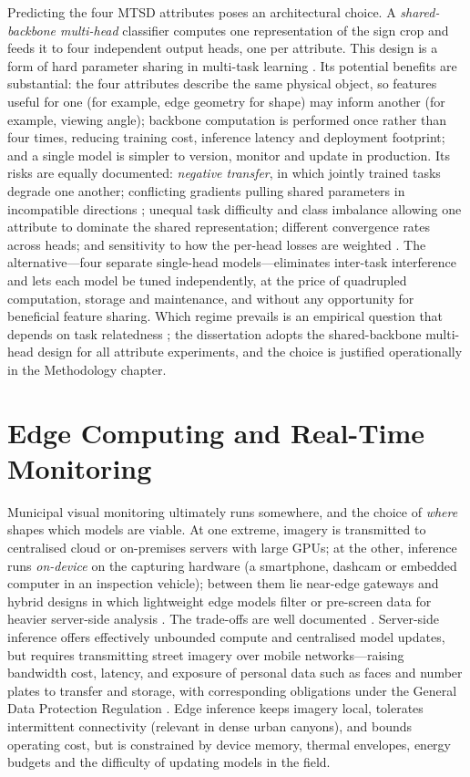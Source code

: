 Predicting the four MTSD attributes poses an architectural choice. A \emph{shared-backbone multi-head} classifier computes one representation of the sign crop and feeds it to four independent output heads, one per attribute. This design is a form of hard parameter sharing in multi-task learning \citep{caruana1997multitask,ruder2017overview}. Its potential benefits are substantial: the four attributes describe the same physical object, so features useful for one (for example, edge geometry for shape) may inform another (for example, viewing angle); backbone computation is performed once rather than four times, reducing training cost, inference latency and deployment footprint; and a single model is simpler to version, monitor and update in production. Its risks are equally documented: \emph{negative transfer}, in which jointly trained tasks degrade one another; conflicting gradients pulling shared parameters in incompatible directions \citep{yu2020gradient}; unequal task difficulty and class imbalance allowing one attribute to dominate the shared representation; different convergence rates across heads; and sensitivity to how the per-head losses are weighted \citep{kendall2018multi,chen2018gradnorm}. The alternative---four separate single-head models---eliminates inter-task interference and lets each model be tuned independently, at the price of quadrupled computation, storage and maintenance, and without any opportunity for beneficial feature sharing. Which regime prevails is an empirical question that depends on task relatedness \citep{standley2020tasks}; the dissertation adopts the shared-backbone multi-head design for all attribute experiments, and the choice is justified operationally in the Methodology chapter.

\section{Edge Computing and Real-Time Monitoring}
\label{sec:bg-edge}

Municipal visual monitoring ultimately runs somewhere, and the choice of \emph{where} shapes which models are viable. At one extreme, imagery is transmitted to centralised cloud or on-premises servers with large GPUs; at the other, inference runs \emph{on-device} on the capturing hardware (a smartphone, dashcam or embedded computer in an inspection vehicle); between them lie near-edge gateways and hybrid designs in which lightweight edge models filter or pre-screen data for heavier server-side analysis \citep{shi2016edge,satyanarayanan2017emergence,chen2019deep}. The trade-offs are well documented \citep{murshed2021machine}. Server-side inference offers effectively unbounded compute and centralised model updates, but requires transmitting street imagery over mobile networks---raising bandwidth cost, latency, and exposure of personal data such as faces and number plates to transfer and storage, with corresponding obligations under the General Data Protection Regulation \citep{gdpr2016}. Edge inference keeps imagery local, tolerates intermittent connectivity (relevant in dense urban canyons), and bounds operating cost, but is constrained by device memory, thermal envelopes, energy budgets and the difficulty of updating models in the field.


